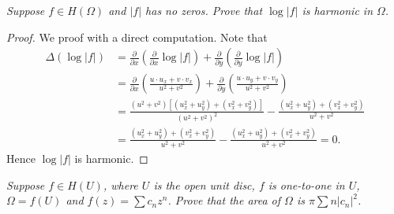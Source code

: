\begin{problem}\em
Suppose $f\in H(\Omega)$ and $|f|$ has no zeros. Prove that $\log|f|$ is harmonic in $\Omega$.
\end{problem}
\begin{proof}
We proof with a direct computation. Note that 
$$
\begin{aligned}
\Delta \left( \log \left| f \right| \right) &=\frac{\partial}{\partial x}\left( \frac{\partial}{\partial x}\log \left| f \right| \right) +\frac{\partial}{\partial y}\left( \frac{\partial}{\partial y}\log \left| f \right| \right) 
\\
&=\frac{\partial}{\partial x}\left( \frac{u\cdot u_x+v\cdot v_x}{u^2+v^2} \right) +\frac{\partial}{\partial y}\left( \frac{u\cdot u_y+v\cdot v_y}{u^2+v^2} \right) 
\\
&=\frac{\left( u^2+v^2 \right) \left[ \left( u_{x}^{2}+u_{y}^{2} \right) +\left( v_{x}^{2}+v_{y}^{2} \right) \right]}{\left( u^2+v^2 \right) ^2}-\frac{\left( u_{x}^{2}+u_{y}^{2} \right) +\left( v_{x}^{2}+v_{y}^{2} \right)}{u^2+v^2}
\\
&=\frac{\left( u_{x}^{2}+u_{y}^{2} \right) +\left( v_{x}^{2}+v_{y}^{2} \right)}{u^2+v^2}-\frac{\left( u_{x}^{2}+u_{y}^{2} \right) +\left( v_{x}^{2}+v_{y}^{2} \right)}{u^2+v^2}=0.
\end{aligned}
$$
Hence $\log|f|$ is harmonic.
\end{proof}
\begin{problem}\em
Suppose $f\in H(U)$, where $U$ is the open unit disc, $f$ is one-to-one in $U$, $\Omega=f(U)$ and $f(z)=\sum c_nz^n$. Prove that the area of $\Omega$ is $\pi\sum n|c_n|^2$.
\end{problem}
